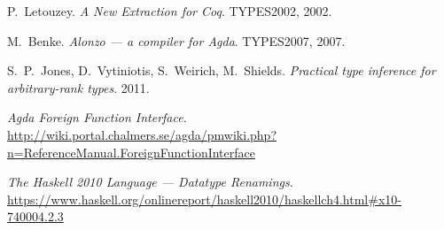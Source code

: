 \begin{thebibliography}{99}

   P.~Letouzey.
   \emph{A New Extraction for Coq}.
   TYPES2002, 2002.

   M.~Benke.
   \emph{Alonzo --- a compiler for Agda}.
   TYPES2007, 2007.

   S.~P.~Jones, D.~Vytiniotis, S.~Weirich, M.~Shields.
   \emph{Practical type inference for arbitrary-rank types}.
   2011.

   \emph{Agda Foreign Function Interface}.\\
   \url{http://wiki.portal.chalmers.se/agda/pmwiki.php?n=ReferenceManual.ForeignFunctionInterface}

   \emph{The Haskell 2010 Language --- Datatype Renamings}.\\
   \url{https://www.haskell.org/onlinereport/haskell2010/haskellch4.html\#x10-740004.2.3}

\end{thebibliography}
